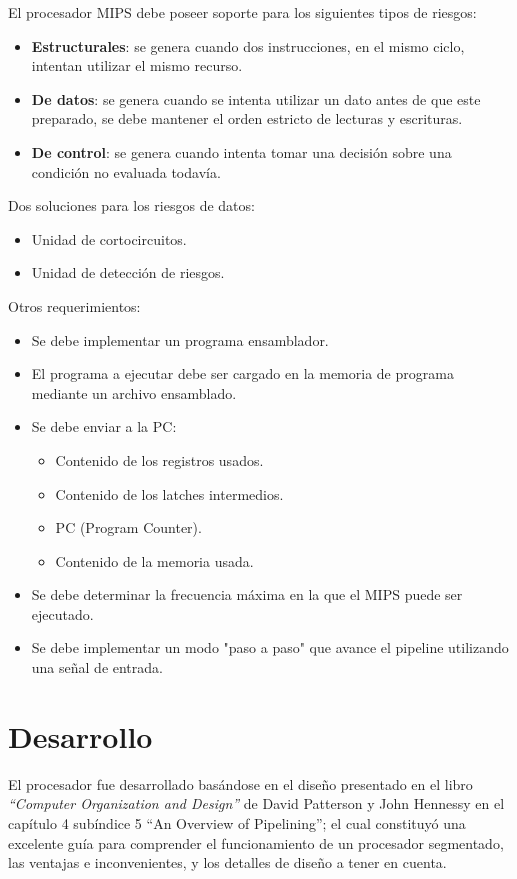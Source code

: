 \documentclass[12pt,A4paper,titlepage]{article}
\begin{document}
El procesador MIPS debe poseer soporte para los siguientes tipos de riesgos:
\begin{itemize}
    \item \textbf{Estructurales}: se genera cuando dos instrucciones, en el mismo ciclo, intentan utilizar el mismo recurso.
    
    \item \textbf{De datos}: se genera cuando se intenta utilizar un dato antes de que este preparado, se debe mantener el orden estricto de lecturas y escrituras.
    
    \item \textbf{De control}: se genera cuando intenta tomar una decisión sobre una condición no evaluada todavía.
\end{itemize}

\noindent Dos soluciones para los riesgos de datos:
\begin{itemize}
    \item Unidad de cortocircuitos.
    \item Unidad de detección de riesgos.
\end{itemize}

\noindent Otros requerimientos:
\begin{itemize}
    \item Se debe implementar un programa ensamblador.
    \item El programa a ejecutar debe ser cargado en la memoria de programa mediante un archivo ensamblado.
    \item Se debe enviar a la PC:
    \begin{itemize}
        \item Contenido de los registros usados.
        \item Contenido de los latches intermedios.
        \item PC (Program Counter).
        \item Contenido de la memoria usada.
    \end{itemize}
    \item Se debe determinar la frecuencia máxima en la que el MIPS puede ser ejecutado.
    \item Se debe implementar un modo "paso a paso" que avance el pipeline utilizando una señal de entrada.
\end{itemize}

\section{Desarrollo}
El procesador fue desarrollado basándose en el diseño presentado en el libro \textit{“Computer Organization and Design”} de David Patterson y John Hennessy en el capítulo 4 subíndice 5 “An Overview of Pipelining”; el cual constituyó una excelente guía para comprender el funcionamiento de un procesador segmentado, las ventajas e inconvenientes, y los detalles de diseño a tener en cuenta.
\end{document}
